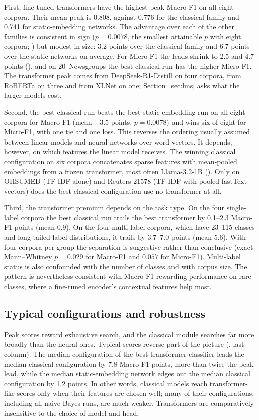 \documentclass{ijis}
\begin{document}
First, fine-tuned transformers have the highest peak Macro-F1 on all eight corpora. Their mean peak is 0.808, against 0.776 for the classical family and 0.741 for static-embedding networks. The advantage over each of the other families is consistent in sign ($p = 0.0078$, the smallest attainable $p$ with eight corpora; ) but modest in size: 3.2 points over the classical family and 6.7 points over the static networks on average. For Micro-F1 the leads shrink to 2.5 and 4.7 points (), and on 20~Newsgroups the best classical run has the higher Micro-F1. The transformer peak comes from DeepSeek-R1-Distill on four corpora, from RoBERTa on three and from XLNet on one; Section~\ref{sec:lms} asks what the larger models cost.

Second, the best classical run beats the best static-embedding run on all eight corpora for Macro-F1 (mean $+3.5$ points, $p = 0.0078$) and wins six of eight for Micro-F1, with one tie and one loss. This reverses the ordering usually assumed between linear models and neural networks over word vectors. It depends, however, on which features the linear model receives. The winning classical configuration on six corpora concatenates sparse features with mean-pooled embeddings from a frozen transformer, most often Llama-3.2-1B (). Only on OHSUMED (TF-IDF alone) and Reuters-21578 (TF-IDF with pooled fastText vectors) does the best classical configuration use no transformer at all.

Third, the transformer premium depends on the task type. On the four single-label corpora the best classical run trails the best transformer by 0.1--2.3 Macro-F1 points (mean 0.9). On the four multi-label corpora, which have 23--115 classes and long-tailed label distributions, it trails by 3.7--7.0 points (mean 5.6). With four corpora per group the separation is suggestive rather than conclusive (exact Mann--Whitney $p = 0.029$ for Macro-F1 and $0.057$ for Micro-F1). Multi-label status is also confounded with the number of classes and with corpus size. The pattern is nevertheless consistent with Macro-F1 rewarding performance on rare classes, where a fine-tuned encoder's contextual features help most.

\subsection{Typical configurations and robustness}\label{sec:typical}

Peak scores reward exhaustive search, and the classical module searches far more broadly than the neural ones. Typical scores reverse part of the picture (, last column). The median configuration of the best transformer classifier leads the median classical configuration by 7.8 Macro-F1 points, more than twice the peak lead, while the median static-embedding network edges out the median classical configuration by 1.2 points. In other words, classical models reach transformer-like scores only when their features are chosen well; many of their configurations, including all naive Bayes runs, are much weaker. Transformers are comparatively insensitive to the choice of model and head.
\end{document}
